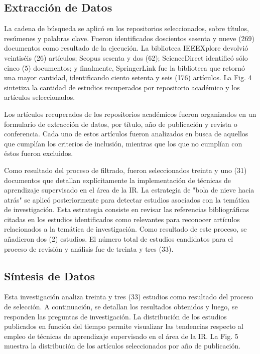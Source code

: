\documentclass[journal]{IEEEtran}
\begin{document}
\subsection{Extracción de Datos}

La cadena de búsqueda se aplicó en los repositorios seleccionados, sobre títulos, resúmenes y palabras clave. Fueron identificados doscientos sesenta y nueve (269) documentos como resultado de la ejecución. La biblioteca IEEEXplore devolvió veintiséis (26) artículos; Scopus sesenta y dos (62); ScienceDirect identificó sólo cinco (5) documentos; y finalmente, SpringerLink fue la biblioteca que retornó una mayor cantidad, identificando ciento setenta y seis (176) artículos. La Fig. 4 sintetiza la cantidad de estudios recuperados por repositorio académico y los artículos seleccionados.

Los artículos recuperados de los repositorios académicos fueron organizados en un formulario de extracción de datos, por título, año de publicación y revista o conferencia. Cada uno de estos artículos fueron analizados en busca de aquellos que cumplían los criterios de inclusión, mientras que los que no cumplían con éstos fueron excluidos. 

Como resultado del proceso de filtrado, fueron seleccionados treinta y uno (31) documentos que detallan explícitamente la implementación de técnicas de aprendizaje supervisado en el área de la IR. La estrategia de "bola de nieve hacia atrás" \cite{wohlin2014guidelines} se aplicó posteriormente para detectar estudios asociados con la temática de investigación. Esta estrategia consiste en revisar las referencias bibliográficas citadas en los estudios identificados como relevantes para reconocer artículos relacionados a la temática de investigación. Como resultado de este proceso, se añadieron dos (2) estudios. El número total de estudios candidatos para el proceso de revisión y análisis fue de treinta y tres (33).

\subsection{Síntesis de Datos }

Esta investigación analiza treinta y tres (33) estudios como resultado del proceso de selección. A continuación, se detallan los resultados obtenidos y luego, se responden las preguntas de investigación.
La distribución de los estudios publicados en función del tiempo permite visualizar las tendencias respecto al empleo de técnicas de aprendizaje supervisado en el área de la IR. La Fig. 5 muestra la distribución de los artículos seleccionados por año de publicación.
\end{document}
